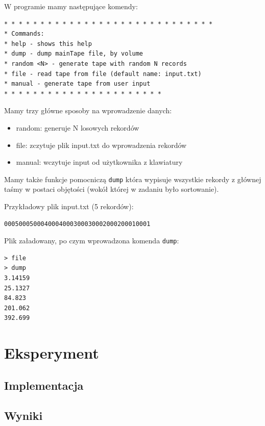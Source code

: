 \documentclass[
]{article}
\providecommand{\tightlist}{%
  \setlength{\itemsep}{0pt}\setlength{\parskip}{0pt}}
\begin{document}
W programie mamy następujące komendy:

\begin{verbatim}
* * * * * * * * * * * * * * * * * * * * * * * * * * * * *
* Commands:
* help - shows this help
* dump - dump mainTape file, by volume
* random <N> - generate tape with random N records
* file - read tape from file (default name: input.txt)
* manual - generate tape from user input
* * * * * * * * * * * * * * * * * * * * * *
\end{verbatim}

Mamy trzy główne sposoby na wprowadzenie danych:

\begin{itemize}
\tightlist
\item
  random: generuje N losowych rekordów
\item
  file: zczytuje plik input.txt do wprowadzenia rekordów
\item
  manual: wczytuje input od użytkownika z klawiatury
\end{itemize}

Mamy także funkcje pomocniczą \texttt{dump} która wypisuje wszystkie
rekordy z głównej taśmy w postaci objętości (wokół której w zadaniu było
sortowanie).

Przykładowy plik input.txt (5 rekordów):

\begin{verbatim}
0005000500040004000300030002000200010001
\end{verbatim}

Plik załadowany, po czym wprowadzona komenda \texttt{dump}:

\begin{verbatim}
> file
> dump
3.14159
25.1327
84.823
201.062
392.699
\end{verbatim}

\section{Eksperyment}\label{eksperyment}

\subsection{Implementacja}\label{implementacja}

\subsection{Wyniki}\label{wyniki}
\end{document}
